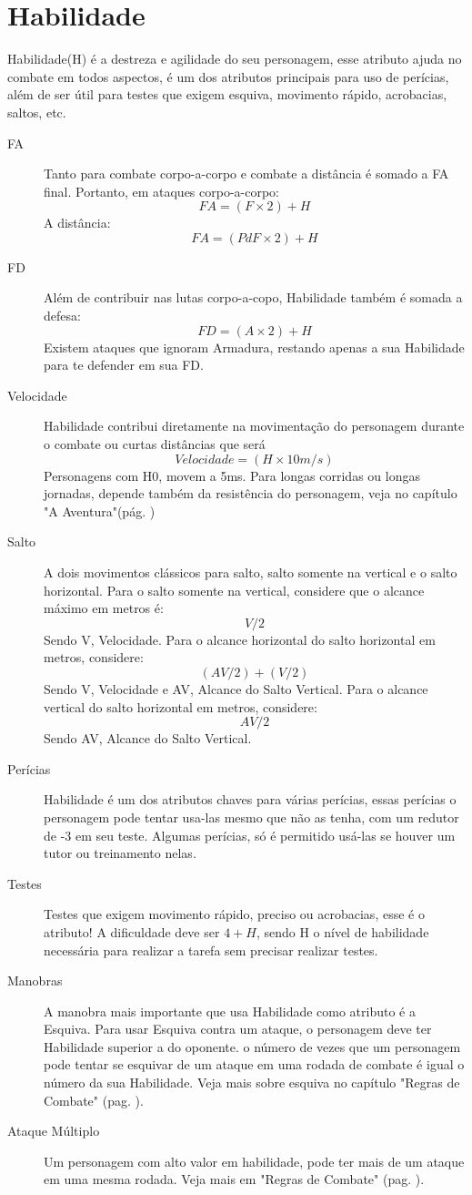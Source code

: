 \section{Habilidade}

Habilidade(H) é a destreza e agilidade do seu personagem, esse atributo ajuda no combate em todos aspectos, é um dos atributos principais para uso de perícias, além de ser útil para testes que exigem esquiva, movimento rápido, acrobacias, saltos, etc.

\begin{description}
\item[FA] Tanto para combate corpo-a-corpo e combate a distância é somado a FA final. Portanto, em ataques corpo-a-corpo:
\[ FA = (F \times 2) + H \]
A distância:
\[ FA = (PdF \times 2) + H \]
\item[FD] Além de contribuir nas lutas corpo-a-copo, Habilidade também é somada a defesa:
\[ FD = (A \times 2) + H \]
Existem ataques que ignoram Armadura, restando apenas a sua Habilidade para te defender em sua FD.
\item[Velocidade] Habilidade contribui diretamente na movimentação do personagem durante o combate ou curtas distâncias que será
\[ Velocidade = (H \times 10m/s) \]
Personagens com H0, movem a 5m\/s. Para longas corridas ou longas jornadas, depende também da resistência do personagem, veja no capítulo "A Aventura"(pág. \pageref{ch:adventure}) 
\item[Salto] A dois movimentos clássicos para salto, salto somente na vertical e o salto  horizontal. Para o salto somente na vertical, considere que o alcance máximo em metros é: 
\[ V/2 \] 
Sendo V, Velocidade.
Para o alcance horizontal do salto horizontal em metros, considere:
\[ (AV / 2) + (V/2) \]
Sendo V, Velocidade e AV, Alcance do Salto Vertical.
Para o alcance vertical do salto horizontal em metros, considere:
\[ AV/2 \]
Sendo AV, Alcance do Salto Vertical.
\item[Perícias] Habilidade é um dos atributos chaves para várias perícias, essas perícias o personagem pode tentar usa-las mesmo que não as tenha, com um redutor de -3 em seu teste. Algumas perícias, só é permitido usá-las se houver um tutor ou treinamento nelas.
\item[Testes] Testes que exigem movimento rápido, preciso ou acrobacias, esse é o atributo! A dificuldade deve ser \( 4 + H \), sendo H o nível de habilidade necessária para realizar a tarefa sem precisar realizar testes.
\item[Manobras] A manobra mais importante que usa Habilidade como atributo é a Esquiva. Para usar Esquiva contra um ataque, o personagem deve ter Habilidade superior a do oponente. o número de vezes que um personagem pode tentar se esquivar de um ataque em uma rodada de combate é igual o número da sua Habilidade. Veja mais sobre esquiva no capítulo "Regras de Combate" (pag. \pageref{ch:combat}).
\item[Ataque Múltiplo] Um personagem com alto valor em habilidade, pode ter mais de um ataque em uma mesma rodada. Veja mais em "Regras de Combate" (pag. \pageref{ch:combat}).
\end{description}

